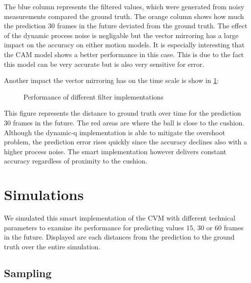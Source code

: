 \documentclass[notitlepage, a4paper, 11pt]{scrartcl}
\begin{document}
\begin{multicols}{2}
The blue column represents the filtered values, which were generated from noisy measurements compared the ground truth. 
The orange column shows how much the prediction 30 frames in the future deviated from the ground truth.
The effect of the dynamic process noise is negligable but the vector mirroring has a large impact on the accuracy on either motion models.
It is especially interesting that the CAM model shows a better performance in this case. 
This is due to the fact this model can be very accurate but is also very sensitive for error.

Another impact the vector mirroring has on the time scale is show in \cref{fig:deviation-noise}:

\begin{figure}[H]
    \centering
    \caption{Performance of different filter implementations}
    \label{fig:deviation-noise}
\end{figure}

This figure represents the distance to ground truth over time for the prediction 30 frames in the future. 
The red areas are where the ball is close to the cushion. 
Although the dynamic-q implementation is able to mitigate the overshoot problem, the prediction error rises quickly since the accuracy declines also with a higher process noise.
The smart implementation however delivers constant accuracy regardless of proximity to the cushion.

\section{Simulations}

We simulated this smart implementation of the CVM with different technical parameters to examine its performance for predicting values 15, 30 or 60 frames in the future.
Displayed are each distances from the prediction to the ground truth over the entire simulation.

\subsection{Sampling}


\end{multicols}
\end{document}
